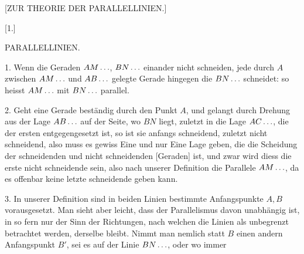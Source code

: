 \clearpage
\begin{center}
[ZUR THEORIE DER PARALLELLINIEN.]
\end{center}

\begin{center}
[1.]

PARALLELLINIEN.
\end{center}

1. Wenn die Geraden $AM\mathinner{.\,.\,.}$, $BN\mathinner{.\,.\,.}$ einander nicht schneiden, jede
durch $A$ zwischen $AM\mathinner{.\,.\,.}$ und $AB\mathinner{.\,.\,.}$ gelegte Gerade hingegen die $BN\mathinner{.\,.\,.}$ schneidet:
so heisst $AM\mathinner{.\,.\,.}$ mit $BN\mathinner{.\,.\,.}$ parallel.

2. Geht eine Gerade beständig durch
den Punkt $A$, und gelangt durch Drehung aus
der Lage $AB\mathinner{.\,.\,.}$ auf der Seite, wo $BN$ liegt,
zuletzt in die Lage $AC\mathinner{.\,.\,.}$, die der ersten entgegengesetzt ist, so ist sie anfangs schneidend,
zuletzt nicht schneidend, also muss es gewiss
Eine und nur Eine Lage geben, die die Scheidung der schneidenden und nicht
schneidenden [Geraden] ist, und zwar wird diess die erste nicht schneidende sein,
also nach unserer Definition die Parallele $AM\mathinner{.\,.\,.}$, da es offenbar keine letzte
schneidende geben kann.

\begin{center}

\end{center}

3. In unserer Definition sind in beiden Linien bestimmte Anfangspunkte
$A, B$ vorausgesetzt. Man sieht aber leicht, dass der Parallelismus davon unabhängig ist, in so fern nur der Sinn der Richtungen, nach welchen die Linien
als unbegrenzt betrachtet werden, derselbe bleibt. Nimmt man nemlich statt
$B$ einen andern Anfangspunkt $B'$, sei es auf der Linie $BN\mathinner{.\,.\,.}$, oder wo immer
